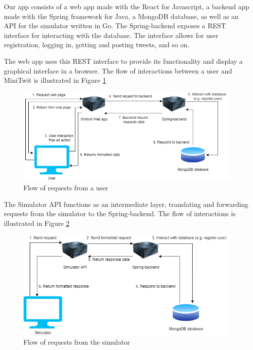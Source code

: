 Our app consists of a web app made with the React for Javascript, a backend app made with the Spring framework for Java, a MongoDB database, as well as an API for the simulator written in Go.
The Spring-backend exposes a REST interface for interacting with the database. The interface allows for user registration, logging in, getting and posting tweets, and so on.

The web app uses this REST interface to provide its functionality and display a graphical interface in a browser. The flow of interactions between a user and MiniTwit is illustrated in Figure \ref{fig:informal_flow}

\begin{figure}[h]
    \centering
    \includegraphics[width=\textwidth]{images/Minitwit flow.drawio.png}
    \caption{Flow of requests from a user}
    \label{fig:informal_flow}
\end{figure}

The Simulator API functions as an intermediate layer, translating and forwarding requests from the simulator to the Spring-backend. The flow of interactions is illustrated in Figure \ref{fig:informal_simulator}

\begin{figure}[h]
    \centering
    \includegraphics[width=\textwidth]{images/Minitwit simulator.drawio.png}
    \caption{Flow of requests from the simulator}
    \label{fig:informal_simulator}
\end{figure}

